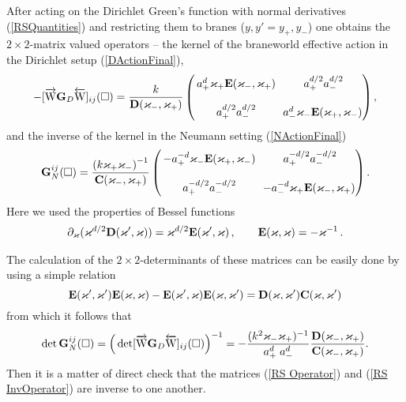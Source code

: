 \documentclass[a4paper,12pt]{article}
\newcommand{\p}{{+}}
\newcommand{\n}{{-}}
\newcommand{\yp}{{y_{+}}}
\newcommand{\yn}{{y_{-}}}
\newcommand{\ddim}{{d}}
\newcommand{\bBox}{\square}  %
\newcommand{\NGrDN}{\overrightarrow{\mathrm{W}}\mathbf{G}_{D}\overleftarrow{\mathrm{W}}} %
\newcommand{\RnGrDnR}{{\NGrDN}} %
\newcommand{\D}{\mathbf{D}}  %
\newcommand{\E}{\mathbf{E}}  %
\newcommand{\C}{\mathbf{C}}  %
\begin{document}
After acting on the Dirichlet Green's function with normal
derivatives (\ref{RSQuantities}) and restricting them to branes
($y,y'=\yp,\yn$) one obtains the $2\times2$-matrix valued operators
-- the kernel of the braneworld effective action in the Dirichlet
setup (\ref{DActionFinal}),
    \begin{eqnarray}
     -[\RnGrDnR]_{ij}(\bBox)=
     \frac{k}{\D(\wnn,\wpp)}
     \left(
     \begin{array}{cc}
      \!\!a^\ddim_\p \wpp\E(\wnn,\wpp)
      &\! a^{\ddim/2}_\p a^{\ddim/2}_\n \\
      &\!\!\\
      \!\! a^{\ddim/2}_\p a^{\ddim/2}_\n
      &\!\!a^\ddim_\n\wnn\E(\wpp,\wnn)
     \end{array}\!\!\!\right),          \label{RS Operator}
    \end{eqnarray}
and the inverse of the kernel in the Neumann setting
(\ref{NActionFinal})
    \begin{eqnarray}
     {\mathbf G}^{ij}_N(\bBox)=
    \frac{\left(k\wpp\wnn\right)^{-1}}
     {\C(\wnn,\wpp)}
     \left(
     \begin{array}{cc}
      \!\!-a^{-\ddim}_\p \wnn\E(\wpp,\wnn)
      &\! a^{-\ddim/2}_\p a^{-\ddim/2}_\n \\
      &\!\!\\
      \!\! a^{-\ddim/2}_\p a^{-\ddim/2}_\n
      &\!\!-a^{-\ddim}_\n \wpp\E(\wnn,\wpp)
     \end{array}\!\!\!\right).         \label{RS InvOperator}
    \end{eqnarray}
Here we used the properties of Bessel functions
\cite{AbramowitzStegun}
    \begin{eqnarray}
     \partial_{\w}(\w^{\ddim/2}\D(\w',\w))=
     \w^{\ddim/2}\E(\w',\w)\,,
     \qquad\E(\w,\w)=-\w^{-1}\,.
    \end{eqnarray}

The calculation of the $2\times2$-determinants of these matrices
can be easily done by using a simple relation
    \begin{equation}
    \E(\w',\w')\E(\w,\w)-\E(\w',\w)\E(\w,\w')
    =\D(\w,\w')\C(\w,\w')
    \end{equation}
from which it follows that
    \begin{eqnarray}
     \det{\mathbf G}^{ij}_N(\bBox)=
     \Big(\det[\RnGrDnR]_{ij}(\bBox)\Big)^{-1}=
     -\frac{(k^2\wnn\wpp)^{-1}}{a^{\ddim}_\p \;a^{\ddim}_\n}
     \frac{\D(\wnn,\wpp)}{\C(\wnn,\wpp)}.
    \end{eqnarray}
Then it is a matter of direct check that the matrices (\ref{RS
Operator}) and (\ref{RS InvOperator}) are inverse to one another.
\end{document}
